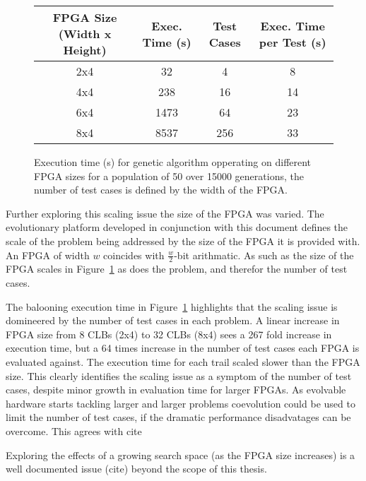 \begin{figure}
	\centering
\begin{tabular}{cccc}
	\toprule
	\bfseries{FPGA Size (Width x Height)} & \bfseries{Exec. Time (s)} & \bfseries{Test Cases}
										  & \bfseries{Exec. Time per Test (s)} \\
	\midrule
	2x4 & 32 & 4 & 8\\
	4x4 & 238 & 16 & 14\\
	6x4 & 1473 & 64 & 23\\
	8x4 & 8537 & 256 & 33\\
	\bottomrule
\end{tabular}
\caption[Execution time for genetic algorithm opperating on different FPGA sizes]
{Execution time (s) for genetic algorithm opperating on different FPGA sizes for
a population of 50 over 15000 generations, the number of test cases is defined
by the width of the FPGA.}
\label{fig:size}
\end{figure}

Further exploring this scaling issue the size of the FPGA was varied.
The evolutionary platform developed in conjunction with this document
defines the scale of the problem being addressed by the size of the FPGA
it is provided with. An FPGA of width $w$ coincides with $\frac{w}{2}$-bit arithmatic.
As such as the size of the FPGA scales in Figure~\ref{fig:size} as does
the problem, and therefor the number of test cases.

The balooning execution time in Figure~\ref{fig:size} highlights that the
scaling issue is domineered by the number of test cases in each problem. A linear increase in FPGA
size from 8 CLBs (2x4) to 32 CLBs (8x4) sees a 267 fold increase in execution
time, but a 64 times increase in the number of test cases each FPGA is evaluated
against. The execution time for each trail scaled slower than the FPGA size.
This clearly identifies the scaling issue as a symptom of the number
of test cases, despite minor growth in evaluation time for larger FPGAs.
As evolvable hardware starts tackling larger and larger
problems coevolution could be used to limit the number of test cases, if the
dramatic performance disadvatages can be overcome. This agrees with \todo cite

Exploring the effects of a growing search space (as the FPGA size increases)
is a well documented issue (\todo cite) beyond the scope of this thesis.
